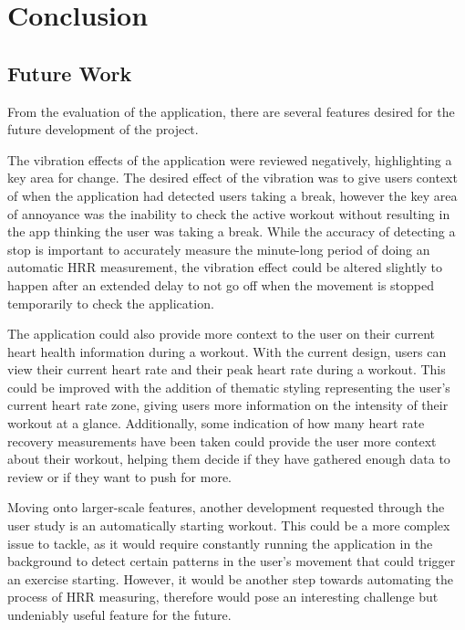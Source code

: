 \documentclass{l4proj}
\begin{document}
\chapter{Conclusion}   
\label{sec:conclusion}

\section{Future Work}
\label{sec:futurework}

From the evaluation of the application, there are several features desired for the future development of the project. 

The vibration effects of the application were reviewed negatively, highlighting a key area for change. The desired effect of the vibration was to give users context of when the application had detected users taking a break, however the key area of annoyance was the inability to check the active workout without resulting in the app thinking the user was taking a break. While the accuracy of detecting a stop is important to accurately measure the minute-long period of doing an automatic HRR measurement, the vibration effect could be altered slightly to happen after an extended delay to not go off when the movement is stopped temporarily to check the application. 

The application could also provide more context to the user on their current heart health information during a workout. With the current design, users can view their current heart rate and their peak heart rate during a workout. This could be improved with the addition of thematic styling representing the user’s current heart rate zone, giving users more information on the intensity of their workout at a glance. Additionally, some indication of how many heart rate recovery measurements have been taken could provide the user more context about their workout, helping them decide if they have gathered enough data to review or if they want to push for more.

Moving onto larger-scale features, another development requested through the user study is an automatically starting workout. This could be a more complex issue to tackle, as it would require constantly running the application in the background to detect certain patterns in the user’s movement that could trigger an exercise starting. However, it would be another step towards automating the process of HRR measuring, therefore would pose an interesting challenge but undeniably useful feature for the future.
\end{document}
